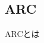 \documentclass[../../../main]{subfiles}
\begin{document}
    \subsection{ARC}\label{subsec:phraseology-arc}

    ARCとは
\end{document}
